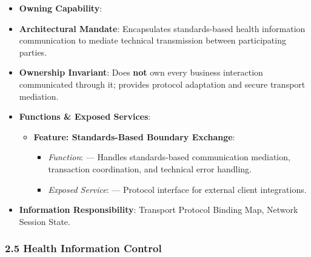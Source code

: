\begin{itemize}

\item 
\textbf{Owning Capability}: \texttt{}



\item 
\textbf{Architectural Mandate}: Encapsulates standards-based health information communication to mediate technical transmission between participating parties.



\item 
\textbf{Ownership Invariant}: Does \textbf{not} own every business interaction communicated through it; provides protocol adaptation and secure transport mediation.



\item 
\textbf{Functions \& Exposed Services}:


\begin{itemize}

\item 
\textbf{Feature: Standards-Based Boundary Exchange}:


\begin{itemize}

\item 
\emph{Function}: \texttt{} — Handles standards-based communication mediation, transaction coordination, and technical error handling.



\item 
\emph{Exposed Service}: \texttt{} — Protocol interface for external client integrations.



\end{itemize}


\end{itemize}


\item 
\textbf{Information Responsibility}: Transport Protocol Binding Map, Network Session State.



\end{itemize}
\label{rad:ise:101}

\par\smallskip
{}\label{rad:ise:103}
\subsubsection*{2.5 Health Information Control}
\label{rad:ise:104}

